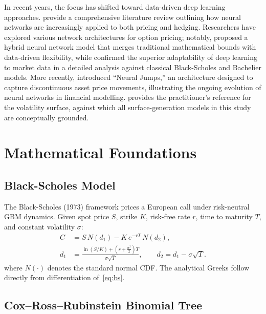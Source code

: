 \documentclass[12pt,a4paper]{article}
\begin{document}
In recent years, the focus has shifted toward data-driven deep learning
approaches.
\citet{RufWang2020} provide a comprehensive literature review outlining how
neural networks are increasingly applied to both pricing and hedging.
Researchers have explored various network architectures for option pricing;
notably, \citet{ShvimerZhu2024} proposed a hybrid neural network model that
merges traditional mathematical bounds with data-driven flexibility, while
\citet{GrossKruger2025} confirmed the superior adaptability of deep learning to
market data in a detailed analysis against classical Black-Scholes and Bachelier
models.
More recently, \citet{Zheng2025} introduced ``Neural Jumps,'' an architecture
designed to capture discontinuous asset price movements, illustrating the
ongoing evolution of neural networks in financial modelling.
\citet{Gatheral2006} provides the practitioner's reference for the volatility
surface, against which all surface-generation models in this study are
conceptually grounded.

\section{Mathematical Foundations}
\label{sec:foundations}

\subsection{Black-Scholes Model}

The Black-Scholes (1973) framework prices a European call under risk-neutral
GBM dynamics.
Given spot price $S$, strike $K$, risk-free rate $r$, time to maturity $T$,
and constant volatility $\sigma$:
\begin{align}
  C &= S\,N(d_1) - K\,e^{-rT}\,N(d_2), \label{eq:bs}\\
  d_1 &= \frac{\ln(S/K) + \left(r + \frac{\sigma^2}{2}\right)T}{\sigma\sqrt{T}},
  \qquad d_2 = d_1 - \sigma\sqrt{T}. \nonumber
\end{align}
where $N(\cdot)$ denotes the standard normal CDF.
The analytical Greeks follow directly from differentiation of~\eqref{eq:bs}.

\subsection{Cox--Ross--Rubinstein Binomial Tree}
\end{document}
